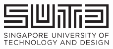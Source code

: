 \documentclass[
11pt, %
oneside, %
english, %
singlespacing, %
parskip, %
headsepline, %
]{MastersDoctoralThesis} %
\author{Eric G. \textsc{Rothstein-Morris}} %
\theoremstyle{definition}
\newcommand{\0}{{0_\TheCategoryOfSets}}
\newcommand{\1}{{1_\TheCategoryOfSets}}
\newcommand{\TheBehaviourOf}[1]{{{\llbracket#1\rrbracket}}}%
\begin{document}
\frontmatter %

\pagestyle{plain} %


\begin{titlepage}
\begin{center}

\begin{figure}[t]
\centering
\includegraphics[width=0.5\textwidth]{Figures/SUTD}\\
\vspace{1cm}
	\centering

\end{figure}
\end{center}
\end{titlepage}
\end{document}
